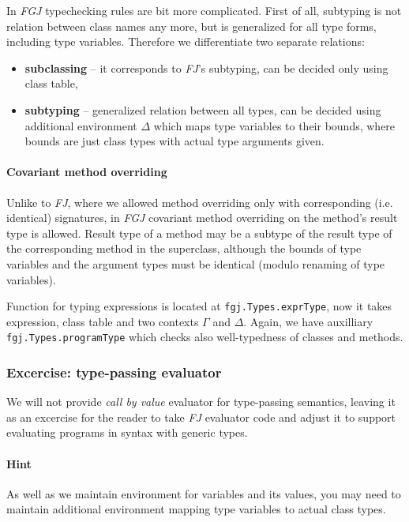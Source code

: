 \documentclass{article}[12pt]
\begin{document}
In \emph{FGJ} typechecking rules are bit more complicated. First of all, subtyping is not relation between class names any more, but is generalized for all type forms, including type variables. Therefore we differentiate two separate relations:

\begin{itemize}
\item{\textbf{subclassing}} -- it corresponds to \emph{FJ}'s subtyping, can be decided only using class table,
\item{\textbf{subtyping}} -- generalized relation between all types, can be decided using additional environment $\Delta$ which maps type variables to their bounds, where bounds are just class types with actual type arguments given.
\end{itemize}

\paragraph{Covariant method overriding}

Unlike to \emph{FJ}, where we allowed method overriding only with corresponding (i.e. identical) signatures, in \emph{FGJ} covariant method overriding on the method's result type is allowed. Result type of a method may be a subtype of the result type of the corresponding method in the superclass, although the bounds of type variables and the argument types must be identical (modulo renaming of type variables).

Function for typing expressions is located at \texttt{fgj.Types.exprType}, now it takes expression, class table and two contexts $\Gamma$ and $\Delta$. Again, we have auxilliary \texttt{fgj.Types.programType} which checks also well-typedness of classes and methods.

\subsubsection{Excercise: type-passing evaluator}

We will not provide \emph{call by value} evaluator for type-passing semantics, leaving it as an excercise for the reader to take \emph{FJ} evaluator code and adjust it to support evaluating programs in syntax with generic types.

\paragraph{Hint} As well as we maintain environment for variables and its values, you may need to maintain additional environment mapping type variables to actual class types.
\end{document}
